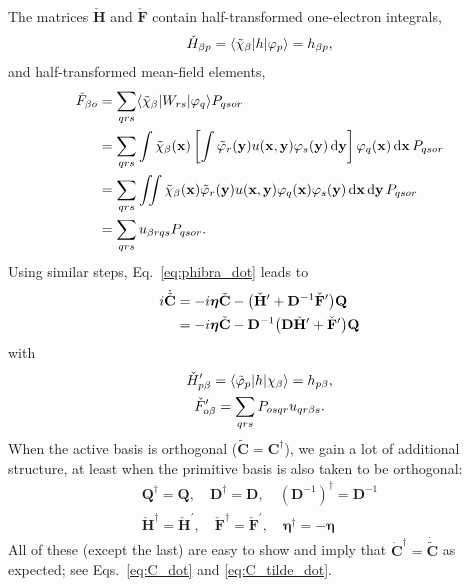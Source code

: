 \documentclass[aip,jcp,preprint,superscriptaddress,nofootinbib]{revtex4-1}
\begin{document}
The matrices $\check{\mathbf{H}}$ and $\check{\mathbf{F}}$ contain
half-transformed one-electron integrals,
\begin{gather}
    \check{H}_{\beta p} = \langle \tilde{\chi}_{\beta} \vert h \vert \varphi_{p} \rangle = h_{\beta p},
\end{gather}
and half-transformed mean-field elements,
\begin{align}
    \check{F}_{\beta o}
    &= \sum_{qrs}  \langle \tilde{\chi}_{\beta} \vert W_{rs} \vert \varphi_{q} \rangle P_{qsor} \nonumber\\
    &= \sum_{qrs}
    \int \tilde{\chi}_{\beta} (\mathbf{x}) \left[ 
    \int \tilde{\varphi}_{r}(\mathbf{y}) u(\mathbf{x}, \mathbf{y}) \varphi_{s}(\mathbf{y})  \dd{\mathbf{y}} 
    \right] \varphi_{q} (\mathbf{x}) \dd{\mathbf{x}}
    P_{qsor} \nonumber\\
    &= \sum_{qrs}
    \iint \tilde{\chi}_{\beta} (\mathbf{x}) \tilde{\varphi}_{r}(\mathbf{y}) u(\mathbf{x}, \mathbf{y}) \varphi_{q} (\mathbf{x}) \varphi_{s}(\mathbf{y}) \dd{\mathbf{x}} \dd{\mathbf{y}} 
    P_{qsor} \nonumber\\
    &= \sum_{qrs}  u_{\beta r q s} P_{qsor}. \label{eq:F_check_from_u_and_rho}
\end{align}
Using similar steps, Eq.~\eqref{eq:phibra_dot} leads to
\begin{align} \label{eq:C_tilde_dot}
    i \dot{\tilde{\mathbf{C}}} 
    &= -i  \bm{\eta} \tilde{\mathbf{C}} - 
    \big( \check{\mathbf{H}}' + \mathbf{D}^{-1} \check{\mathbf{F}}' \big) \mathbf{Q} \nonumber\\
    &= -i  \bm{\eta} \tilde{\mathbf{C}} - 
    \mathbf{D}^{-1} \big( \mathbf{D} \check{\mathbf{H}}' + \check{\mathbf{F}}' \big) \mathbf{Q}
\end{align}
with
\begin{gather}
    \check{H}'_{p \beta} = \langle \tilde{\varphi}_{p} \vert h \vert \chi_{\beta} \rangle = h_{p \beta},  \\
    \check{F}'_{o \beta} = \sum_{qrs} P_{osqr} u_{qr\beta s}.\label{eq:F_check_prime_from_u_and_rho}
\end{gather}
When the active basis is orthogonal ($\tilde{\mathbf{C}} = \mathbf{C}^{\dagger}$), we gain a lot of
additional structure, at least when the primitive basis is also taken to be orthogonal:
\begin{gather}
    \mathbf{Q}^{\dagger}          = \mathbf{Q}, \quad 
    \mathbf{D}^{\dagger}          = \mathbf{D}, \quad 
    (\mathbf{D}^{-1})^{\dagger}   = \mathbf{D}^{-1} \\
    \check{\mathbf{H}}^{\dagger}  = \check{\mathbf{H}}^{\prime}, \quad 
    \check{\mathbf{F}}^{\dagger}  = \check{\mathbf{F}}^{\prime}, \quad
    \bm{\eta}^{\dagger}           = -\bm{\eta}
\end{gather}
All of these (except the last) are easy to show and imply that
$\dot{\mathbf{C}}^{\dagger} = \dot{\tilde{\mathbf{C}}}$ as expected;
see Eqs.~\eqref{eq:C_dot} and \eqref{eq:C_tilde_dot}.
\end{document}
